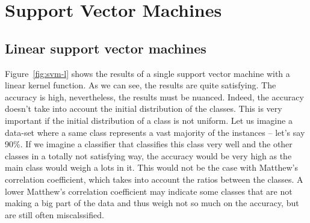 \section{Support Vector Machines}

\subsection{Linear support vector machines}
Figure~\ref{fig:svm-l} shows the results of a single support vector machine with a linear kernel function. As we can see, the results are quite satisfying. The accuracy is high, nevertheless, the results must be nuanced. Indeed, the accuracy doesn't take into account the initial distribution of the classes. This is very important if the initial distribution of a class is not uniform. Let us imagine a data-set where a same class represents a vast majority of the instances -- let's say 90\%. If we imagine a classifier that classifies this class very well and the other classes in a totally not satisfying way, the accuracy would be very high as the main class would weigh a lots in it. This would not be the case with Matthew's correlation coefficient, which takes into account the ratios between the classes. A lower Matthew's correlation coefficient may indicate some classes that are not making a big part of the data and thus weigh not so much on the accuracy, but are still often miscalssified.

